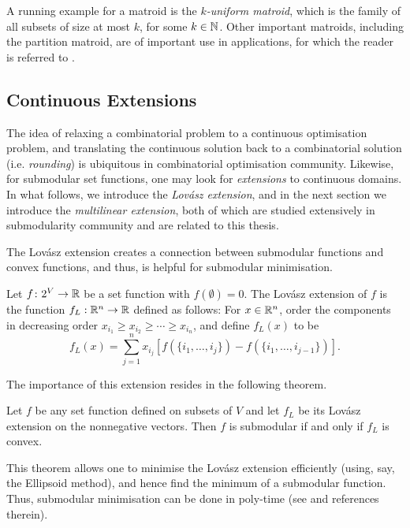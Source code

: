 A running example for a matroid is the \emph{$k$-uniform matroid}, which is the family of all subsets of size at most $k$, for some $k\in\mathbb{N}$. Other important matroids, including the partition matroid, are of important use in applications, for which the reader is referred to \citet[Chapter II.2]{fujishige2005submodular}.


\subsection{Continuous Extensions}\label{sec:extensions}

The idea of relaxing a combinatorial problem to a continuous optimisation problem, and translating the continuous solution back to a combinatorial solution (i.e. \emph{rounding}) is ubiquitous in combinatorial optimisation community. Likewise, for submodular set functions, one may look for \emph{extensions} to continuous domains. In what follows, we introduce the \emph{Lov\'asz extension}, and in the next section we introduce the \emph{multilinear extension},  both of which are studied extensively in submodularity community and are related to this thesis.

The Lov\'asz extension \citep{lovasz1983submodular} creates a connection between submodular functions and convex functions, and thus, is helpful for submodular minimisation. 

\begin{definition}
    Let $f\colon 2^V\to\mathbb{R}$ be a set function with $f(\emptyset) = 0$. The Lov\'asz extension of $f$ is the function $f_L:\mathbb{R}^n\to \mathbb{R}$ defined as follows: For $x\in\mathbb{R}^n$, order the components in decreasing order $x_{i_1} \geq x_{i_2} \geq \cdots \geq x_{i_n}$, and define $f_L(x)$ to be 
    \[
        f_L(x) = \sum_{j=1}^n x_{i_j}[f(\{i_1, \ldots, i_j\}) - f(\{i_1, \ldots, i_{j-1}\}) ].
    \]
\end{definition}
The importance of this extension resides in the following theorem.
\begin{theorem}
    Let $f$ be any set function defined on subsets of $V$ and let $f_L$ be its Lov\'asz extension on the nonnegative vectors. Then $f$ is submodular if and only if $f_L$ is convex.
\end{theorem}

This theorem allows one to minimise the Lov\'asz extension efficiently (using, say, the Ellipsoid method), and hence find the minimum of a submodular function. Thus, submodular minimisation can be done in poly-time (see \citet{fujishige2005submodular} and references therein).

